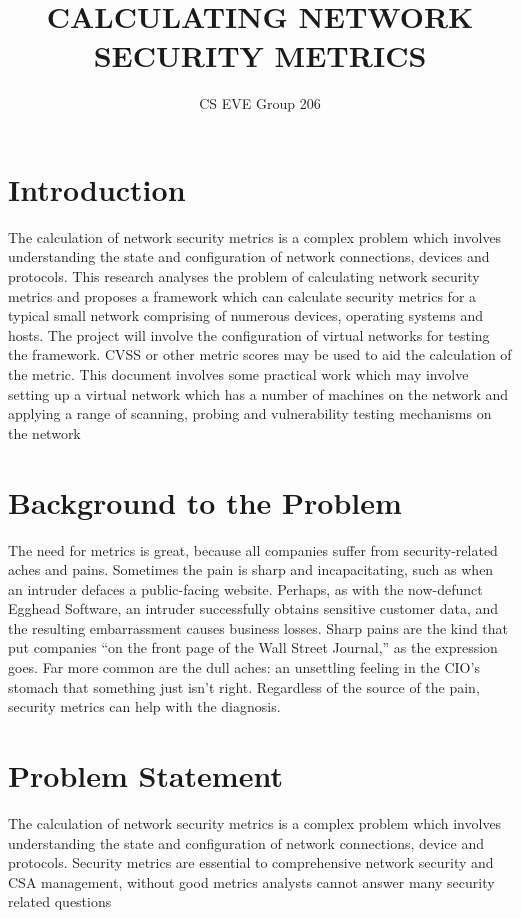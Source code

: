 \documentclass{article}
\begin{document}
\title{CALCULATING NETWORK SECURITY METRICS}
\author{CS EVE Group 206 }
\maketitle
\section{Introduction}
The calculation of network security metrics is a complex problem which involves understanding the state and configuration of network connections, devices and protocols. This research analyses the problem of calculating network security metrics and proposes a framework which can calculate security metrics for a typical small network comprising of numerous devices, operating systems and hosts. The project will involve the configuration of virtual networks for testing the framework. CVSS or other metric scores may be used to aid the calculation of the metric. This document involves some practical work which may involve setting up a virtual network which has a number of machines on the network and applying a range of scanning, probing and vulnerability testing mechanisms on the network
\section{Background to the Problem}
The need for metrics is great, because all companies suffer from security-related aches
and pains. Sometimes the pain is sharp and incapacitating, such as when an intruder
defaces a public-facing website. Perhaps, as with the now-defunct Egghead Software, an
intruder successfully obtains sensitive customer data, and the resulting embarrassment
causes business losses. Sharp pains are the kind that put companies “on the front page of
the Wall Street Journal,” as the expression goes. Far more common are the dull aches:
an unsettling feeling in the CIO’s stomach that something just isn’t right. Regardless of
the source of the pain, security metrics can help with the diagnosis.
\section{Problem Statement}
The calculation of network security metrics is a complex problem which involves understanding the state and configuration of network connections, device and protocols. Security metrics are essential to comprehensive network security and CSA management, without good metrics analysts cannot answer many security related questions
\end{document}
